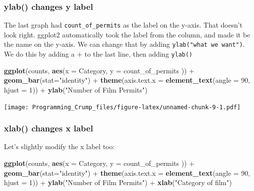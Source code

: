 \documentclass[]{book}
\newenvironment{Shaded}{\begin{snugshade}}{\end{snugshade}}
\newcommand{\KeywordTok}[1]{\textcolor[rgb]{0.13,0.29,0.53}{\textbf{{#1}}}}
\newcommand{\DataTypeTok}[1]{\textcolor[rgb]{0.13,0.29,0.53}{{#1}}}
\newcommand{\DecValTok}[1]{\textcolor[rgb]{0.00,0.00,0.81}{{#1}}}
\newcommand{\StringTok}[1]{\textcolor[rgb]{0.31,0.60,0.02}{{#1}}}
\newcommand{\NormalTok}[1]{{#1}}
\theoremstyle{definition}
\theoremstyle{definition}
\theoremstyle{definition}
\theoremstyle{remark}
\begin{document}
\subsubsection{ylab() changes y label}\label{ylab-changes-y-label}

The last graph had \texttt{count\_of\_permits} as the label on the
y-axis. That doesn't look right. ggplot2 automatically took the label
from the column, and made it be the name on the y-axis. We can change
that by adding \texttt{ylab("what\ we\ want")}. We do this by adding a
\(+\) to the last line, then adding \texttt{ylab()}

\begin{Shaded}
\begin{Highlighting}[]
\KeywordTok{ggplot}\NormalTok{(counts, }\KeywordTok{aes}\NormalTok{(}\DataTypeTok{x =} \NormalTok{Category, }\DataTypeTok{y =} \NormalTok{count_of_permits )) +}
\StringTok{  }\KeywordTok{geom_bar}\NormalTok{(}\DataTypeTok{stat=}\StringTok{"identity"}\NormalTok{) +}\StringTok{ }
\StringTok{  }\KeywordTok{theme}\NormalTok{(}\DataTypeTok{axis.text.x =} \KeywordTok{element_text}\NormalTok{(}\DataTypeTok{angle =} \DecValTok{90}\NormalTok{, }\DataTypeTok{hjust =} \DecValTok{1}\NormalTok{)) +}
\StringTok{  }\KeywordTok{ylab}\NormalTok{(}\StringTok{"Number of Film Permits"}\NormalTok{)}
\end{Highlighting}
\end{Shaded}

\texttt{[image: Programming\_Crump\_files/figure-latex/unnamed-chunk-9-1.pdf]}

\subsubsection{xlab() changes x label}\label{xlab-changes-x-label}

Let's slightly modify the x label too:

\begin{Shaded}
\begin{Highlighting}[]
\KeywordTok{ggplot}\NormalTok{(counts, }\KeywordTok{aes}\NormalTok{(}\DataTypeTok{x =} \NormalTok{Category, }\DataTypeTok{y =} \NormalTok{count_of_permits )) +}
\StringTok{  }\KeywordTok{geom_bar}\NormalTok{(}\DataTypeTok{stat=}\StringTok{"identity"}\NormalTok{) +}\StringTok{ }
\StringTok{  }\KeywordTok{theme}\NormalTok{(}\DataTypeTok{axis.text.x =} \KeywordTok{element_text}\NormalTok{(}\DataTypeTok{angle =} \DecValTok{90}\NormalTok{, }\DataTypeTok{hjust =} \DecValTok{1}\NormalTok{)) +}
\StringTok{  }\KeywordTok{ylab}\NormalTok{(}\StringTok{"Number of Film Permits"}\NormalTok{) +}\StringTok{ }
\StringTok{  }\KeywordTok{xlab}\NormalTok{(}\StringTok{"Category of film"}\NormalTok{)}
\end{Highlighting}
\end{Shaded}
\end{document}

